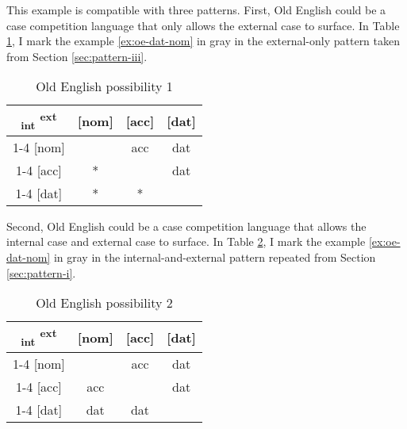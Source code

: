 This example is compatible with three patterns. First, Old English could be a case competition language that only allows the external case to surface. In Table \ref{tbl:oe-poss1}, I mark the example \ref{ex:oe-dat-nom} in gray in the external-only pattern taken from Section \ref{sec:pattern-iii}.

 \begin{table}[H]
   \center
   \caption{Old English possibility 1}
   \begin{tabular}{c|c|c|c}
     \toprule
     \textsubscript{\ac{int}} \textsuperscript{\ac{ext}}
            & [\ac{nom}]
            & [\ac{acc}]
            & [\ac{dat}]
            \\ \cmidrule{1-4}
        [\ac{nom}]
            & \xcancel{\phantom{xx}}
            & \ac{acc}
            & \cellcolor{LG}\ac{dat}
            \\ \cmidrule{1-4}
        [\ac{acc}]
            & *
            & \xcancel{\phantom{xx}}
            & \ac{dat}
            \\ \cmidrule{1-4}
        [\ac{dat}]
            & *
            & *
            & \xcancel{\phantom{xx}}
            \\
      \bottomrule
   \end{tabular}
     \label{tbl:oe-poss1}
 \end{table}

Second, Old English could be a case competition language that allows the internal case and external case to surface. In Table \ref{tbl:oe-poss2}, I mark the example \ref{ex:oe-dat-nom} in gray in the internal-and-external pattern repeated from Section \ref{sec:pattern-i}.

  \begin{table}[H]
    \center
    \caption{Old English possibility 2}
    \begin{tabular}{c|c|c|c}
      \toprule
      \textsubscript{\ac{int}} \textsuperscript{\ac{ext}}
             & [\ac{nom}]
             & [\ac{acc}]
             & [\ac{dat}]
             \\ \cmidrule{1-4}
         [\ac{nom}]
             & \xcancel{\phantom{xx}}
             & \ac{acc}
             & \cellcolor{LG}\ac{dat}
             \\ \cmidrule{1-4}
         [\ac{acc}]
             & \ac{acc}
             & \xcancel{\phantom{xx}}
             & \ac{dat}
             \\ \cmidrule{1-4}
         [\ac{dat}]
             & \ac{dat}
             & \ac{dat}
             & \xcancel{\phantom{xx}}
             \\
       \bottomrule
    \end{tabular}
      \label{tbl:oe-poss2}
  \end{table}


